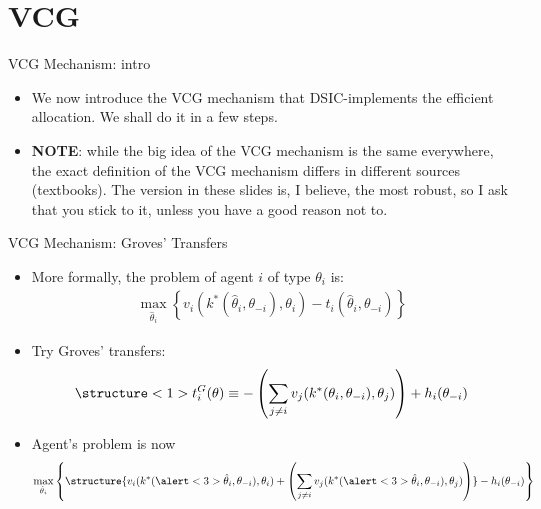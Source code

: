 \documentclass[english,10pt
,aspectratio=169
,handout
]{beamer}
\begin{document}
\section{VCG}

\begin{frame}{VCG Mechanism: intro}
\begin{itemize}
	\item We now introduce the VCG mechanism that DSIC-implements the efficient allocation. We shall do it in a few steps.
	\item \textbf{NOTE}: while the big idea of the VCG mechanism is the same everywhere, the \alert{exact definition} of the VCG mechanism \alert{differs} in different sources (textbooks). The version in these slides is, I believe, the most robust, so I ask that you stick to it, unless you have a good reason not to.
\end{itemize}
\end{frame}


\begin{frame}{VCG Mechanism: Groves' Transfers}
\begin{itemize}
	\item More formally, the problem of agent $i$ of type $\theta_i$ is:
	\vspace{-0.5em}\begin{align*}
	\max_{\hat{\theta}_i} \left\{  v_i(k^*(\hat{\theta}_i,\theta_{-i}),\theta_i) - t_i(\hat{\theta}_i,\theta_{-i}) \right\}
	\end{align*}\vspace{-1em}
	\item Try \alert<1>{Groves' transfers}:
	\vspace{-0.5em}\begin{align*}
	\structure<1>{ t^G_{i}(\theta) \equiv -\left(\sum_{j\neq i} v_{j}(k^*(\theta_i, \theta_{-i}), \theta_{j}) \right) + h_{i}(\theta_{-i}) }
	\end{align*}\vspace{-1em}
	\item Agent's problem is now
	\vspace{-0.5em}\begin{align*}
	\max_{\hat{\theta}_i} \left\{ \structure{v_i(k^*(\alert<3>{\hat{\theta}_i},\theta_{-i}),\theta_i) + \left( \sum_{j\neq i} v_{j}(k^*(\alert<3>{\hat{\theta}_i},\theta_{-i}), \theta_{j}) \right)} - h_{i}(\theta_{-i}) \right\}
	\end{align*}
\end{itemize}
\end{frame}
\end{document}
